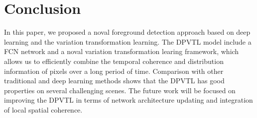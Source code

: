 \documentclass[journal]{IEEEtran}
\begin{document}
\section{Conclusion}
\label{sec6}
In this paper, we proposed a noval foreground detection approach based on deep learning and the variation transformation learning. The DPVTL model include a FCN network and a noval variation transformation learing framework, which allows us to efficiently combine the temporal coherence and distribution information of pixels over a long period of time. Comparison with other traditional and deep learning methods shows that the DPVTL has good properties on several challenging scenes.
The future work will be focused on improving the DPVTL in terms of network architecture updating and integration of local spatial coherence.

% 
\ifCLASSOPTIONcaptionsoff
  \newpage
\fi

  
  
\end{document}

